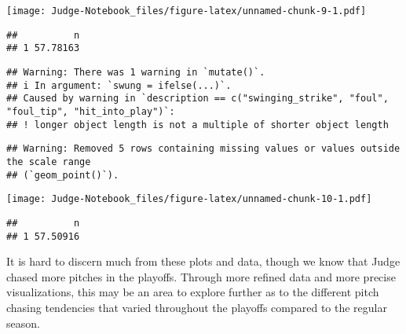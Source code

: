 \documentclass[
]{article}
\begin{document}
\texttt{[image: Judge-Notebook\_files/figure-latex/unnamed-chunk-9-1.pdf]}

\begin{verbatim}
##          n
## 1 57.78163
\end{verbatim}

\begin{verbatim}
## Warning: There was 1 warning in `mutate()`.
## i In argument: `swung = ifelse(...)`.
## Caused by warning in `description == c("swinging_strike", "foul", "foul_tip", "hit_into_play")`:
## ! longer object length is not a multiple of shorter object length
\end{verbatim}

\begin{verbatim}
## Warning: Removed 5 rows containing missing values or values outside the scale range
## (`geom_point()`).
\end{verbatim}

\texttt{[image: Judge-Notebook\_files/figure-latex/unnamed-chunk-10-1.pdf]}

\begin{verbatim}
##          n
## 1 57.50916
\end{verbatim}

It is hard to discern much from these plots and data, though we know
that Judge chased more pitches in the playoffs. Through more refined
data and more precise visualizations, this may be an area to explore
further as to the different pitch chasing tendencies that varied
throughout the playoffs compared to the regular season.
\end{document}

